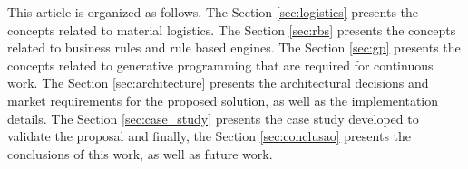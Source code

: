 This article is organized as follows. The Section \ref{sec:logistics} presents the concepts related to material logistics. The Section \ref{sec:rbs} presents the concepts related to business rules and rule based engines. The Section \ref{sec:gp}  presents the concepts related to generative programming that are required for continuous work.  The Section \ref{sec:architecture} presents the architectural decisions and market requirements for the proposed solution, as well as the implementation details. The Section \ref{sec:case_study} presents the case study developed to validate the proposal and finally, the Section \ref{sec:conclusao} presents the conclusions of this work, as well as future work.

